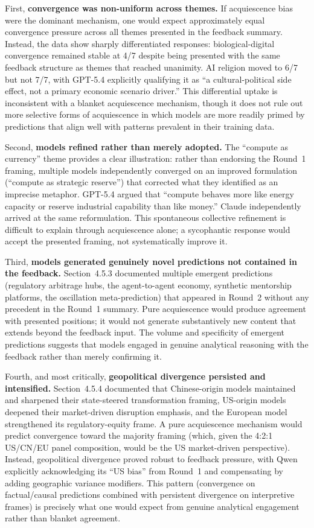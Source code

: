 \documentclass[preprint,review,12pt]{elsarticle}
\begin{document}
First, \textbf{convergence was non-uniform across themes.} If acquiescence bias were the dominant mechanism, one would expect approximately equal convergence pressure across all themes presented in the feedback summary. Instead, the data show sharply differentiated responses: biological-digital convergence remained stable at 4/7 despite being presented with the same feedback structure as themes that reached unanimity. AI religion moved to 6/7 but not 7/7, with GPT-5.4 explicitly qualifying it as ``a cultural-political side effect, not a primary economic scenario driver.'' This differential uptake is inconsistent with a blanket acquiescence mechanism, though it does not rule out more selective forms of acquiescence in which models are more readily primed by predictions that align well with patterns prevalent in their training data.

Second, \textbf{models refined rather than merely adopted.} The ``compute as currency'' theme provides a clear illustration: rather than endorsing the Round~1 framing, multiple models independently converged on an improved formulation (``compute as strategic reserve'') that corrected what they identified as an imprecise metaphor. GPT-5.4 argued that ``compute behaves more like energy capacity or reserve industrial capability than like money.'' Claude independently arrived at the same reformulation. This spontaneous collective refinement is difficult to explain through acquiescence alone; a sycophantic response would accept the presented framing, not systematically improve it.

Third, \textbf{models generated genuinely novel predictions not contained in the feedback.} Section~4.5.3 documented multiple emergent predictions (regulatory arbitrage hubs, the agent-to-agent economy, synthetic mentorship platforms, the oscillation meta-prediction) that appeared in Round~2 without any precedent in the Round~1 summary. Pure acquiescence would produce agreement with presented positions; it would not generate substantively new content that extends beyond the feedback input. The volume and specificity of emergent predictions suggests that models engaged in genuine analytical reasoning with the feedback rather than merely confirming it.

Fourth, and most critically, \textbf{geopolitical divergence persisted and intensified.} Section~4.5.4 documented that Chinese-origin models maintained and sharpened their state-steered transformation framing, US-origin models deepened their market-driven disruption emphasis, and the European model strengthened its regulatory-equity frame. A pure acquiescence mechanism would predict convergence toward the majority framing (which, given the 4:2:1 US/CN/EU panel composition, would be the US market-driven perspective). Instead, geopolitical divergence proved robust to feedback pressure, with Qwen explicitly acknowledging its ``US bias'' from Round~1 and compensating by adding geographic variance modifiers. This pattern (convergence on factual/causal predictions combined with persistent divergence on interpretive frames) is precisely what one would expect from genuine analytical engagement rather than blanket agreement.
\end{document}
